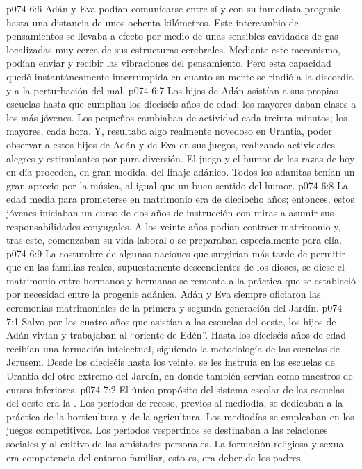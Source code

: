 \vs p074 6:6 Adán y Eva podían comunicarse entre sí y con su inmediata progenie hasta una distancia de unos ochenta kilómetros. Este intercambio de pensamientos se llevaba a efecto por medio de unas sensibles cavidades de gas localizadas muy cerca de sus estructuras cerebrales. Mediante este mecanismo, podían enviar y recibir las vibraciones del pensamiento. Pero esta capacidad quedó instantáneamente interrumpida en cuanto su mente se rindió a la discordia y a la perturbación del mal.
\vs p074 6:7 \pc Los hijos de Adán asistían a sus propias escuelas hasta que cumplían los dieciséis años de edad; los mayores daban clases a los más jóvenes. Los pequeños cambiaban de actividad cada treinta minutos; los mayores, cada hora. Y, resultaba algo realmente novedoso en Urantia, poder observar a estos hijos de Adán y de Eva en sus juegos, realizando actividades alegres y estimulantes por pura diversión. El juego y el humor de las razas de hoy en día proceden, en gran medida, del linaje adánico. Todos los adanitas tenían un gran aprecio por la música, al igual que un buen sentido del humor.
\vs p074 6:8 La edad media para prometerse en matrimonio era de dieciocho años; entonces, estos jóvenes iniciaban un curso de dos años de instrucción con miras a asumir sus responsabilidades conyugales. A los veinte años podían contraer matrimonio y, tras este, comenzaban su vida laboral o se preparaban especialmente para ella.
\vs p074 6:9 La costumbre de algunas naciones que surgirían más tarde de permitir que en las familias reales, supuestamente descendientes de los dioses, se diese el matrimonio entre hermanos y hermanas se remonta a la práctica que se estableció por necesidad entre la progenie adánica. Adán y Eva siempre oficiaron las ceremonias matrimoniales de la primera y segunda generación del Jardín.
\vs p074 7:1 Salvo por los cuatro años que asistían a las escuelas del oeste, los hijos de Adán vivían y trabajaban al “oriente de Edén”. Hasta los dieciséis años de edad recibían una formación intelectual, siguiendo la metodología de las escuelas de Jerusem. Desde los dieciséis hasta los veinte, se les instruía en las escuelas de Urantia del otro extremo del Jardín, en donde también servían como maestros de cursos inferiores.
\vs p074 7:2 El único propósito del sistema escolar de las escuelas del oeste era la . Los períodos de receso, previos al mediodía, se dedicaban a la práctica de la horticultura y de la agricultura. Los mediodías se empleaban en los juegos competitivos. Los períodos vespertinos se destinaban a las relaciones sociales y al cultivo de las amistades personales. La formación religiosa y sexual era competencia del entorno familiar, esto es, era deber de los padres.
